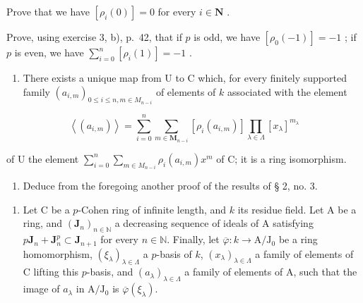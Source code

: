 Prove that we have \([\rho_i(0)] = 0\) for every \(i \in \mathbf{N}\) .

Prove, using exercise 3, b), p.~42, that if \(p\) is odd, we have \([\rho_0(-1)] = -1\) ; if \(p\) is even, we have \(\sum_{i=0}^{n} [\rho_i(1)] = -1\) .

\begin{enumerate}
\def\labelenumi{\alph{enumi})}
\setcounter{enumi}{2}
\tightlist
\item
  There exists a unique map from U to C which, for every finitely supported family \((a_{i,m})_{0\leqslant i\leqslant n,m\in M_{n - i}}\) of elements of \(k\) associated with the element
\end{enumerate}

\[
\left\langle \left(a _ {i, m}\right) \right\rangle = \sum_ {i = 0} ^ {n} \sum_ {m \in \mathbf {M} _ {n - i}} \left[ \rho_ {i} (a _ {i, m}) \right] \prod_ {\lambda \in \Lambda} [ x _ {\lambda} ] ^ {m _ {\lambda}}
\]

of U the element \(\sum_{i=0}^{n}\sum_{m\in M_{n-i}}\rho_i(a_{i,m})x^m\) of C; it is a ring isomorphism.

\begin{enumerate}
\def\labelenumi{\alph{enumi})}
\setcounter{enumi}{3}
\tightlist
\item
  Deduce from the foregoing another proof of the results of § 2, no. 3.
\end{enumerate}

\begin{enumerate}
\def\labelenumi{\arabic{enumi})}
\setcounter{enumi}{3}
\tightlist
\item
  Let C be a \(p\)-Cohen ring of infinite length, and \(k\) its residue field. Let A be a ring, and \((\mathbf{J}_n)_{n \in \mathbb{N}}\) a decreasing sequence of ideals of A satisfying \(p\mathbf{J}_n + \mathbf{J}_n^p \subset \mathbf{J}_{n+1}\) for every \(n \in \mathbb{N}\). Finally, let \(\overline{\varphi}: k \to \mathrm{A} / \mathrm{J}_0\) be a ring homomorphism, \((\xi_\lambda)_{\lambda \in \Lambda}\) a \(p\)-basis of \(k\), \((x_\lambda)_{\lambda \in \Lambda}\) a family of elements of C lifting this \(p\)-basis, and \((a_\lambda)_{\lambda \in \Lambda}\) a family of elements of A, such that the image of \(a_\lambda\) in \(\mathrm{A} / \mathrm{J}_0\) is \(\overline{\varphi}(\xi_\lambda)\).
\end{enumerate}

